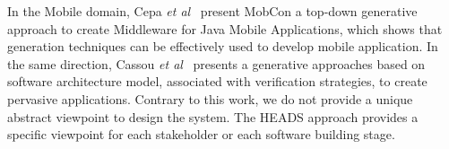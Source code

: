 In the Mobile domain, Cepa {\em et al}~\cite{1385821} present MobCon a top-down generative approach to create Middleware for Java Mobile Applications, which shows that generation techniques can be effectively used to develop mobile application. In the same direction, Cassou {\em et al}~\cite{Cassou:2011:LSA:1985793.1985852} presents a generative approaches based on software architecture model, associated with verification strategies, to create pervasive applications. Contrary to this work, we do not provide a unique abstract viewpoint to design the system. The HEADS approach provides a specific viewpoint for each stakeholder or each software building stage.
